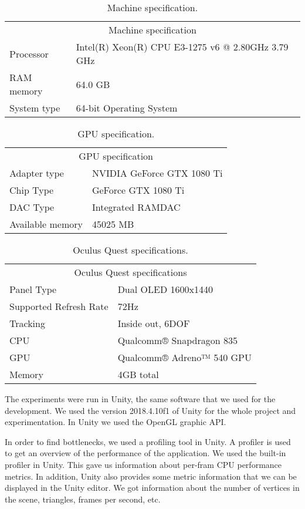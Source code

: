\begin{table}[h!]
\centering
\begin{tabular}{ll}
\multicolumn{2}{c}{Machine specification}                        \\
Processor   & Intel(R) Xeon(R) CPU E3-1275 v6 @ 2.80GHz 3.79 GHz \\
RAM memory  & 64.0 GB                                            \\
System type & 64-bit Operating System
\end{tabular}
\caption{Machine specification.}
\label{tab:machine-specs}
\end{table}

\begin{table}[h!]
\centering
\begin{tabular}{ll}
\multicolumn{2}{c}{GPU specification} \\
Adapter type   & NVIDIA GeForce GTX 1080 Ti \\
Chip Type  &  GeForce GTX 1080 Ti \\
DAC Type & Integrated RAMDAC \\
Available memory & 45025 MB
\end{tabular}
\caption{GPU specification.}
\label{tab:gpu-specs}
\end{table}

\begin{table}[h!]
\centering
\begin{tabular}{ll}
\multicolumn{2}{c}{Oculus Quest specifications} \\
Panel Type   & Dual OLED 1600x1440 \\
Supported Refresh Rate  &  72Hz \\
Tracking & Inside out, 6DOF \\
CPU & Qualcomm® Snapdragon 835 \\
GPU & Qualcomm® Adreno™ 540 GPU \\
Memory & 4GB total
\end{tabular}
\caption{Oculus Quest specifications.}
\label{tab:oculus-specs}
\end{table}

The experiments were run in Unity, the same software that we used for the development. We used the version 2018.4.10f1 of Unity for the whole project and experimentation. In Unity we used the OpenGL graphic API.

In order to find bottlenecks, we used a profiling tool in Unity. A profiler is used to get an overview of the performance of the application. We used the built-in profiler in Unity. This gave us information about per-fram CPU  performance metrics. In addition, Unity also provides some metric information that we can be displayed in the Unity editor. We got information about the number of vertices in the scene, triangles, frames per second, etc.

